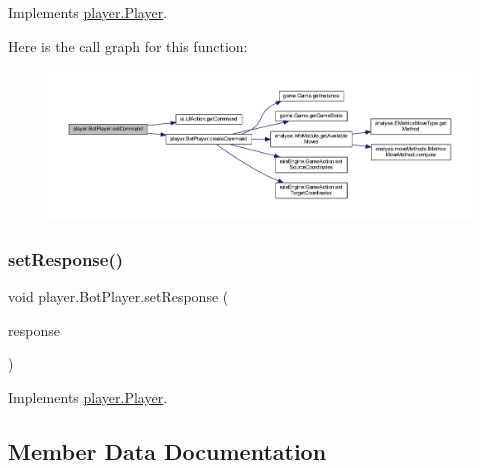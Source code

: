 Implements \mbox{\hyperlink{interfaceplayer_1_1_player_a76a4425b3d1908982f07b75c4a054501}{player.\+Player}}.

Here is the call graph for this function\+:
\nopagebreak
\begin{figure}[H]
\begin{center}
\leavevmode
\includegraphics[width=350pt]{classplayer_1_1_bot_player_a716f0bd1509ca717defac662e8a3bb27_cgraph}
\end{center}
\end{figure}
\mbox{\label{classplayer_1_1_bot_player_a4b71aed2b100f4edd770bb1a0c4f7de9}} 
\subsubsection{\texorpdfstring{set\+Response()}{setResponse()}}
{\footnotesize\ttfamily void player.\+Bot\+Player.\+set\+Response (\begin{DoxyParamCaption}\item[{\mbox{\hyperlink{classui_1_1_game_response}{Game\+Response}}}]{response }\end{DoxyParamCaption})\hspace{0.3cm}{\ttfamily [inline]}}



Implements \mbox{\hyperlink{interfaceplayer_1_1_player_af07ff250619f6dabf201ee2e2f488a4f}{player.\+Player}}.



\subsection{Member Data Documentation}
\mbox{\label{classplayer_1_1_bot_player_a54dbd39a17ccecad7a4fd2a20e276278}} 
